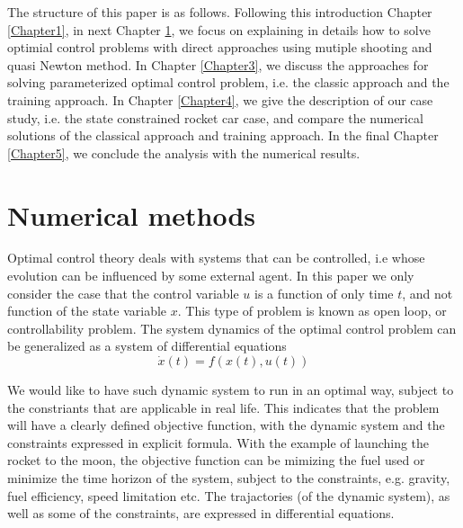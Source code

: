 \documentclass  [
  paper    = a4,
  BCOR     = 10mm,
  twoside,
  fontsize = 12pt,
  fleqn,
  toc      = bibnumbered,
  toc      = listofnumbered,
  numbers  = noendperiod,
  headings = normal,
  listof   = leveldown,
  version  = 3.03
]                                       {scrreprt}
\newcommand{\<}{\langle}
\renewcommand{\>}{\rangle}
\begin{document}
The structure of this paper is as follows. Following this introduction Chapter \ref{Chapter1}, in next Chapter \ref{Chapter2}, we focus on explaining in details how to solve optimial control problems with direct approaches using mutiple shooting and quasi Newton method. In Chapter \ref{Chapter3}, we discuss the approaches for solving parameterized optimal control problem, i.e. the classic approach and the training approach.  In Chapter \ref{Chapter4}, we give the description of our case study, i.e. the state constrained rocket car case, and compare the numerical solutions of the classical approach and training approach. In the final Chapter \ref{Chapter5}, we conclude the analysis with the numerical results. 




\chapter{Numerical methods}
\label{Chapter2}
Optimal control theory deals with systems that can be controlled, i.e whose evolution can be influenced by some external agent. In this paper we only consider the case that the control variable $u$ is a function of only time $t$, and not function of the state variable $x$. This type of problem is known as open loop, or controllability problem. The system dynamics of the optimal control problem can be generalized as a system of differential equations 
\begin{equation}
	  \dot{x} (t) = f(x(t), u(t))
\end{equation}	  

We would like to have such dynamic system to run in an optimal way, subject to the constriants that are applicable in real life. This indicates that the problem will have a clearly defined objective function, with the dynamic system and the constraints expressed in explicit formula. With the example of launching the rocket to the moon, the objective function can be mimizing the fuel used or minimize the time horizon of the system, subject to the constraints, e.g. gravity, fuel efficiency, speed limitation etc. The trajactories (of the dynamic system), as well as some of the constraints, are expressed in differential equations.  
\end{document}
